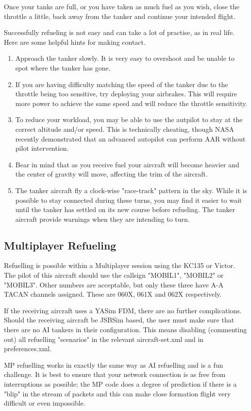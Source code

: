 Once your tanks are full, or you have taken as much fuel as you wish,
close the throttle a little, back away from the tanker and continue
your intended flight.

Successfully refueling is not easy and can take a lot of practise, as in real
life. Here are some helpful hints for making contact.

\begin{enumerate}
\item Approach the tanker slowly. It is very easy to overshoot and be unable to
spot where the tanker has gone.
\item If you are having difficulty matching the speed of the tanker due to the
throttle being too sensitive, try deploying your airbrakes. This will require
more power to achieve the same speed and will reduce the throttle sensitivity.
\item To reduce your workload, you may be able to use the autpilot to stay at
the correct altitude and/or speed. This is technically cheating, though NASA
recently demonstrated that an advanced autopilot can perform AAR without pilot
intervention.
\item Bear in mind that as you receive fuel your aircraft will become heavier
and the center of gravity will move, affecting the trim of the aircraft.
\item The tanker aircraft fly a clock-wise "race-track" pattern in the sky.
While it is possible to stay connected during these turns, you may find it
easier to wait until the tanker has settled on its new course before refueling.
The tanker aircraft provide warnings when they are intending to turn.
\end{enumerate}

\subsection{Multiplayer Refueling}

Refuelling is possible within a Multiplayer session using the KC135 or Victor.
The pilot of this aircraft should use the callsign "MOBIL1", "MOBIL2" or "MOBIL3".
Other numbers are acceptable, but only these three have A-A TACAN
channels assigned.  These are 060X, 061X and 062X respectively.

If the receiving aircraft uses a YASim FDM, there are no further
complications.  Should the receiving aircraft be JSBSim based, the user
must make sure that there are no AI tankers in their configuration.
This means disabling (commenting out) all refuelling "scenarios" in the
relevant aircraft-set.xml and in preferences.xml.

MP refuelling works in exactly the same way as AI refuelling and is a
fun challenge.  It is best to ensure that your network connection is as
free from interruptions as possible; the MP code does a degree of
prediction if there is a "blip" in the stream of packets and this can
make close formation flight very difficult or even impossible.

\fi

